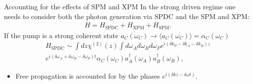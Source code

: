 \documentclass[final]{beamer} %
\begin{document}
\begin{frame}[t]
\begin{columns}[t]
\begin{column}{0.34\paperwidth} 
\begin{alertblock}{Accounting for the effects of SPM and XPM}
In the strong driven regime one needs to consider both the photon generation via SPDC and the SPM and XPM:
\begin{align*}
H=H_{\text{SPDC}}+H_{\text{XPM}}+H_{\text{SPM}}.
\end{align*}
If the pump is a strong coherent state $a_C(\omega_C)\to \langle a_C(\omega_C) \rangle = \alpha_C(\omega_C)$
\begin{align*}
\label{hi}
 H_{\text{SPDC}} \sim  \int dz \chi^{(2)}(z) \int d\omega _A d\omega
_B d\omega _P e^{i(\delta k _P-\delta k_A-\delta k_B) z}  \\
e^{i (\delta \omega_A+\delta \omega_B-\delta \omega_P) t} \alpha_C(\omega_C)  a_A^{\dagger }(\omega_A)  a_B^{\dagger }(\omega _B),
\end{align*}
\begin{itemize}
\item Free propagation is accounted for by the phases $e^{i (\delta k z -\delta \omega t)}$.


\end{itemize}
\end{alertblock}
\end{column}
\end{columns}
\end{frame}
\end{document}

